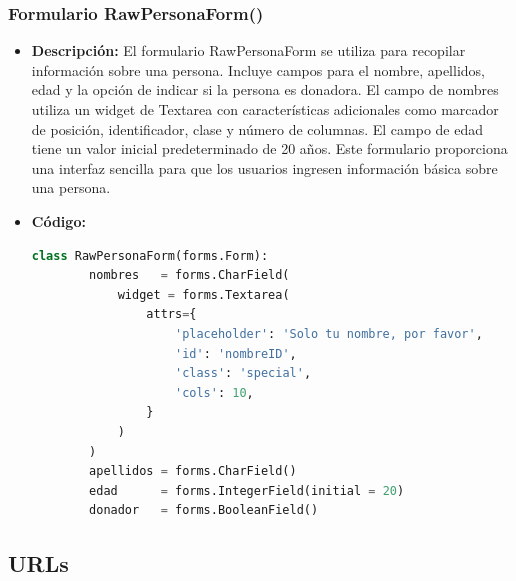 \documentclass{article}
\begin{document}
  
  \subsubsection{Formulario RawPersonaForm()}
  \begin{itemize}
    \item \textbf{Descripción: }El formulario RawPersonaForm se utiliza para recopilar información sobre una persona. 
    Incluye campos para el nombre, apellidos, edad y la opción de indicar si la persona es donadora. El campo de nombres utiliza un 
    widget de Textarea con características adicionales como marcador de posición, identificador, clase y número de columnas. 
    El campo de edad tiene un valor inicial predeterminado de 20 años. Este formulario proporciona una interfaz sencilla para 
    que los usuarios ingresen información básica sobre una persona.
    \item \textbf{Código: }
    \begin{lstlisting}[language=Python]
      class RawPersonaForm(forms.Form):
        nombres   = forms.CharField(
            widget = forms.Textarea(
                attrs={
                    'placeholder': 'Solo tu nombre, por favor',
                    'id': 'nombreID',
                    'class': 'special',
                    'cols': 10,
                }
            )
        )
        apellidos = forms.CharField()
        edad      = forms.IntegerField(initial = 20)
        donador   = forms.BooleanField()
    \end{lstlisting}   
  \end{itemize}
  

  \subsection{URLs}
  
  
\end{document}
